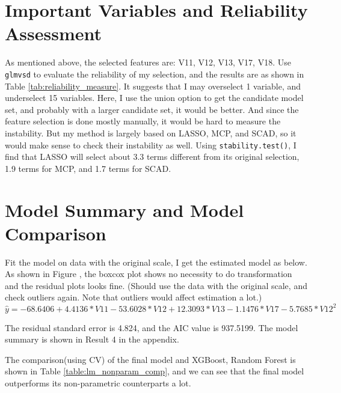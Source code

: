 \documentclass[11pt a4paper]{article}
\begin{document}
	
	
	\section{Important Variables and Reliability Assessment}\label{sec: important-features}
	As mentioned above, the selected features are: V11, V12, V13, V17, V18. Use \texttt{glmvsd}\cite{glmvsdR} to evaluate the reliability of my selection, and the results are as shown in Table \ref{tab:reliability_measure}. It suggests that I may overselect 1 variable, and underselect 15 variables. Here, I use the union option to get the candidate model set, and probably with a larger candidate set, it would be better. And since the feature selection is done mostly manually, it would be hard to measure the instability. But my method is largely based on LASSO, MCP, and SCAD, so it would make sense to check their instability as well. Using \texttt{stability.test()}, I find that LASSO will select about 3.3 terms different from its original selection, 1.9 terms for MCP, and 1.7 terms for SCAD.
	
	
	
	
	\section{Model Summary and Model Comparison}\label{sec: summary-comparison}
	Fit the model on data with the original scale, I get the estimated model as below. As shown in Figure , the boxcox plot shows no necessity to do transformation and the residual plots looks fine. (Should use the data with the original scale, and check outliers again. Note that outliers would affect estimation a lot.)
	\[ \hat{y} = -68.6406 + 4.4136*V11 - 53.6028*V12 + 12.3093*V13 - 1.1476*V17 - 5.7685*V12^2  \]
	
	The residual standard error is 4.824, and the AIC value is 937.5199. The model summary is shown in Result 4 in the appendix.
	
	The comparison(using CV) of the final model and XGBoost, Random Forest is shown in Table \ref{table:lm_nonparam_comp}, and we can see that the final model outperforms its non-parametric counterparts a lot.
	
	
\end{document}
